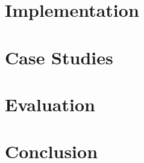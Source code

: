 \documentclass[11pt,twoside,final]{mitthesis}
\begin{document}
\chapter{Implementation}%
\label{ch:impl}


\chapter{Case Studies}%
\label{ch:case studies}


\chapter{Evaluation}%
\label{ch:eval}


\chapter{Conclusion}%
\label{ch:conclusion}



\begin{spacing}{1}
{}

\end{spacing}
\end{document}

